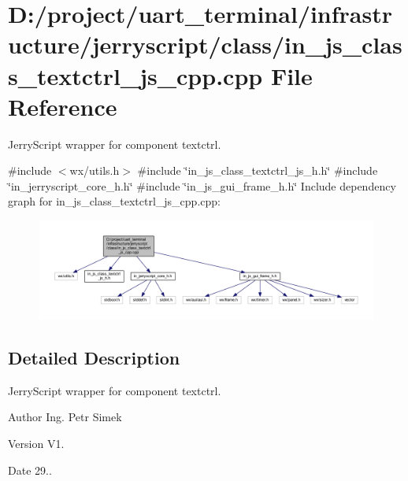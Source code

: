 \section{D\+:/project/uart\+\_\+terminal/infrastructure/jerryscript/class/in\+\_\+js\+\_\+class\+\_\+textctrl\+\_\+js\+\_\+cpp.cpp File Reference}
\label{in__js__class__textctrl__js__cpp_8cpp}


Jerry\+Script wrapper for component textctrl.  


{\ttfamily \#include $<$wx/utils.\+h$>$}\newline
{\ttfamily \#include \char`\"{}in\+\_\+js\+\_\+class\+\_\+textctrl\+\_\+js\+\_\+h.\+h\char`\"{}}\newline
{\ttfamily \#include \char`\"{}in\+\_\+jerryscript\+\_\+core\+\_\+h.\+h\char`\"{}}\newline
{\ttfamily \#include \char`\"{}in\+\_\+js\+\_\+gui\+\_\+frame\+\_\+h.\+h\char`\"{}}\newline
Include dependency graph for in\+\_\+js\+\_\+class\+\_\+textctrl\+\_\+js\+\_\+cpp.\+cpp\+:
\nopagebreak
\begin{figure}[H]
\begin{center}
\leavevmode
\includegraphics[width=350pt]{in__js__class__textctrl__js__cpp_8cpp__incl}
\end{center}
\end{figure}


\subsection{Detailed Description}
Jerry\+Script wrapper for component textctrl. 

\begin{DoxyAuthor}{Author}
Ing. Petr Simek 
\end{DoxyAuthor}
\begin{DoxyVersion}{Version}
V1. 
\end{DoxyVersion}
\begin{DoxyDate}{Date}
29.. 
\end{DoxyDate}
